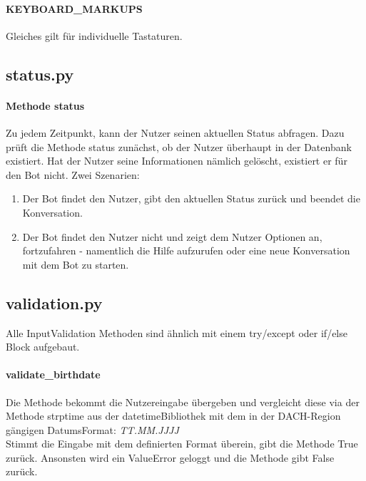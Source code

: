             \paragraph{KEYBOARD\_MARKUPS}
                Gleiches gilt für individuelle Tastaturen. 
                

        \subsection{status.py}
            \paragraph{Methode status}
                Zu jedem Zeitpunkt, kann der Nutzer seinen aktuellen Status abfragen. Dazu prüft die Methode status zunächst, ob der Nutzer überhaupt in der Datenbank existiert. Hat der Nutzer seine Informationen nämlich gelöscht, existiert er für den Bot nicht. Zwei Szenarien: 
                \begin{enumerate}
                    \item Der Bot findet den Nutzer, gibt den aktuellen Status zurück und beendet die Konversation.
                    \item Der Bot findet den Nutzer nicht und zeigt dem Nutzer Optionen an, fortzufahren - namentlich die Hilfe aufzurufen oder eine neue Konversation mit dem Bot zu starten.
                \end{enumerate}
        

        \subsection{validation.py}
            Alle Input\-Validation Methoden sind ähnlich mit einem try/except oder if/else Block aufgebaut.

            \paragraph{validate\_birthdate}
                Die Methode bekommt die Nutzereingabe übergeben und vergleicht diese via der Methode strptime aus der datetime\-Bibliothek \cite{datetime} mit dem in der DACH-Region gängigen Datums\-Format: \emph{TT.MM.JJJJ} \\
                Stimmt die Eingabe mit dem definierten Format überein, gibt die Methode True zurück. Ansonsten wird ein ValueError geloggt und die Methode gibt False zurück.

